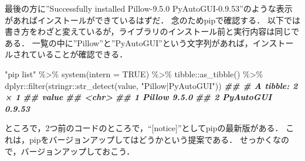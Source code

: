 \documentclass[
]{article}
\newenvironment{Shaded}{\begin{snugshade}}{\end{snugshade}}
\newcommand{\AttributeTok}[1]{\textcolor[rgb]{0.77,0.63,0.00}{#1}}
\newcommand{\ConstantTok}[1]{\textcolor[rgb]{0.00,0.00,0.00}{#1}}
\newcommand{\DocumentationTok}[1]{\textcolor[rgb]{0.56,0.35,0.01}{\textbf{\textit{#1}}}}
\newcommand{\FunctionTok}[1]{\textcolor[rgb]{0.00,0.00,0.00}{#1}}
\newcommand{\NormalTok}[1]{#1}
\newcommand{\SpecialCharTok}[1]{\textcolor[rgb]{0.00,0.00,0.00}{#1}}
\newcommand{\StringTok}[1]{\textcolor[rgb]{0.31,0.60,0.02}{#1}}
\begin{document}
最後の方に''Successfully installed Pillow-9.5.0 PyAutoGUI-0.9.53''のような表示があればインストールができているはずだ．
念のためpipで確認する．
以下では書き方をわざと変えているが，ライブラリのインストール前と実行内容は同じである．
一覧の中に''Pillow''と''PyAutoGUI''という文字列があれば，インストールされていることが確認できる．

\begin{Shaded}
\begin{Highlighting}[]
\StringTok{"pip list"} \SpecialCharTok{\%\textgreater{}\%}
  \FunctionTok{system}\NormalTok{(}\AttributeTok{intern =} \ConstantTok{TRUE}\NormalTok{) }\SpecialCharTok{\%\textgreater{}\%}
\NormalTok{  tibble}\SpecialCharTok{::}\FunctionTok{as\_tibble}\NormalTok{() }\SpecialCharTok{\%\textgreater{}\%}
\NormalTok{  dplyr}\SpecialCharTok{::}\FunctionTok{filter}\NormalTok{(stringr}\SpecialCharTok{::}\FunctionTok{str\_detect}\NormalTok{(value, }\StringTok{"Pillow|PyAutoGUI"}\NormalTok{))}
\DocumentationTok{\#\# \# A tibble: 2 × 1}
\DocumentationTok{\#\#   value               }
\DocumentationTok{\#\#   \textless{}chr\textgreater{}               }
\DocumentationTok{\#\# 1 Pillow          9.5.0 }
\DocumentationTok{\#\# 2 PyAutoGUI       0.9.53}
\end{Highlighting}
\end{Shaded}

ところで，2つ前のコードのところで，``{[}notice{]}''としてpipの最新版がある．
これは，pipをバージョンアップしてはどうかという提案である．
せっかくなので，バージョンアップしておこう．
\end{document}
